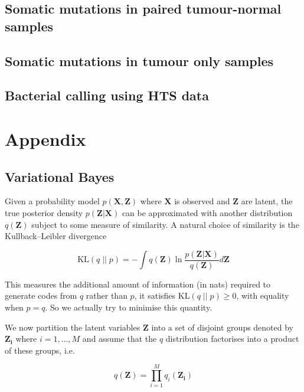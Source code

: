 \documentclass{article}
\begin{document}
\subsection{Somatic mutations in paired tumour-normal samples}

\subsection{Somatic mutations in tumour only samples}

\subsection{Bacterial calling using HTS data}

\section{Appendix}

\subsection{Variational Bayes}

Given a probability model $p(\boldsymbol{X}, \boldsymbol{Z})$ where $\boldsymbol{X}$ is observed and $\boldsymbol{Z}$ are latent, the true posterior density $p(\boldsymbol{Z} | \boldsymbol{X})$ can be approximated with another distribution $q(\boldsymbol{Z})$ subject to some measure of similarity. A natural choice of similarity is the Kullback–Leibler divergence

\begin{equation}
\label{eq:kl}
   \text{KL} (q\; ||\; p) = -\int q(\boldsymbol{Z}) \ln \frac{p(\boldsymbol{Z} | \boldsymbol{X})}{q(\boldsymbol{Z})} d\boldsymbol{Z}
\end{equation}

This measures the additional amount of information (in nats) required to generate codes from $q$ rather than $p$, it satisfies $\text{KL}(q\; ||\; p) \ge 0$, with equality when $p = q$. So we actually try to minimise this quantity.

We now partition the latent variables $\boldsymbol{Z}$ into a set of disjoint groups denoted by $\boldsymbol{Z_i}$ where $i = 1, \dots, M$ and assume that the $q$ distribution factorises into a product of these groups, i.e.

\begin{equation}
\label{eq:q}
  q(\boldsymbol{Z}) = \prod_{i = 1}^M q_i(\boldsymbol{Z_i})
\end{equation}
\end{document}
